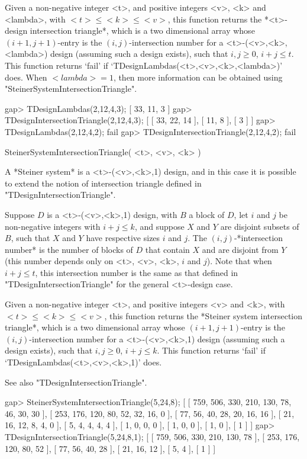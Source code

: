 Given a non-negative integer <t>, and positive integers <v>, <k>
and <lambda>, with $<t>\le <k>\le <v>$, this function returns the
*<t>-design intersection triangle*, which is a two dimensional array
whose $(i+1,j+1)$-entry is the $(i,j)$-intersection number for
a <t>-(<v>,<k>,<lambda>) design (assuming such a design exists),
such that $i,j\ge 0$, $i+j\le t$. This function returns `fail' if
`TDesignLambdas(<t>,<v>,<k>,<lambda>)' does. When $<lambda>=1$, then more
information can be obtained using "SteinerSystemIntersectionTriangle".

\beginexample
gap> TDesignLambdas(2,12,4,3);             
[ 33, 11, 3 ]
gap> TDesignIntersectionTriangle(2,12,4,3);
[ [ 33, 22, 14 ], [ 11, 8 ], [ 3 ] ]
gap> TDesignLambdas(2,12,4,2);             
fail
gap> TDesignIntersectionTriangle(2,12,4,2);
fail
\endexample



\>SteinerSystemIntersectionTriangle( <t>, <v>, <k> )

A *Steiner system* is a <t>-(<v>,<k>,1) design, and in this case it
is possible to extend the notion of intersection triangle defined in
"TDesignIntersectionTriangle".

Suppose $D$ is a <t>-(<v>,<k>,1) design, with $B$ a block of $D$,
let $i$ and $j$ be non-negative integers with $i+j\le k$, and suppose
$X$ and $Y$ are disjoint subsets of $B$, such that $X$ and $Y$ have
respective sizes $i$ and $j$. The $(i,j)$-*intersection number* is the
number of blocks of $D$ that contain $X$ and are disjoint from $Y$
(this number depends only on <t>, <v>, <k>, $i$ and $j$). Note that
when $i+j\le t$, this intersection number is the same as that defined in
"TDesignIntersectionTriangle" for the general <t>-design case.

Given a non-negative integer <t>, and positive integers <v> and
<k>, with $<t>\le <k>\le <v>$, this function returns the *Steiner
system intersection triangle*, which is a two dimensional array whose
$(i+1,j+1)$-entry is the $(i,j)$-intersection number for a <t>-(<v>,<k>,1)
design (assuming such a design exists), such that $i,j\ge 0$, $i+j\le
k$. This function returns `fail' if `TDesignLambdas(<t>,<v>,<k>,1)' does.

See also "TDesignIntersectionTriangle".

\beginexample
gap> SteinerSystemIntersectionTriangle(5,24,8);
[ [ 759, 506, 330, 210, 130, 78, 46, 30, 30 ], 
  [ 253, 176, 120, 80, 52, 32, 16, 0 ], [ 77, 56, 40, 28, 20, 16, 16 ], 
  [ 21, 16, 12, 8, 4, 0 ], [ 5, 4, 4, 4, 4 ], [ 1, 0, 0, 0 ], [ 1, 0, 0 ], 
  [ 1, 0 ], [ 1 ] ]
gap> TDesignIntersectionTriangle(5,24,8,1);    
[ [ 759, 506, 330, 210, 130, 78 ], [ 253, 176, 120, 80, 52 ], 
  [ 77, 56, 40, 28 ], [ 21, 16, 12 ], [ 5, 4 ], [ 1 ] ]
\endexample



